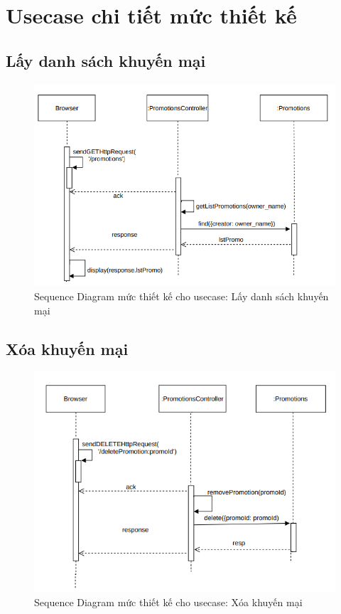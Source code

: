 \section{Usecase chi tiết mức thiết kế}
\subsection{Lấy danh sách khuyến mại}
\begin{figure}[H]
	\centering
	\includegraphics[width=12cm]{Image/223.png}
	\vspace{0.5cm}
	\caption{Sequence Diagram mức thiết kế cho usecase: Lấy danh sách khuyến mại}
\end{figure}
\subsection{Xóa khuyến mại}
\begin{figure}[H]
	\centering
	\includegraphics[width=12cm]{Image/rmPro.png}
	\vspace{0.5cm}
	\caption{Sequence Diagram mức thiết kế cho usecase: Xóa khuyến mại}
\end{figure}
